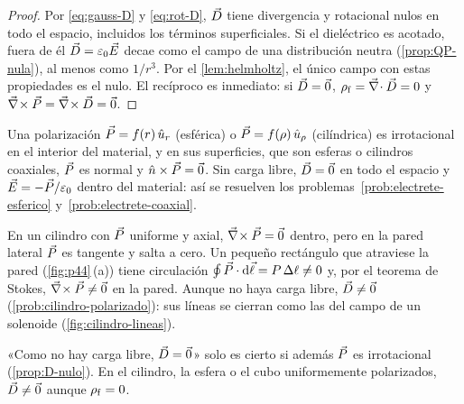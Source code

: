 \begin{proof}
Por \eqref{eq:gauss-D} y \eqref{eq:rot-D}, $\vec D$ tiene divergencia y rotacional nulos en todo el espacio, incluidos
los términos superficiales. Si el dieléctrico es acotado, fuera de él $\vec D=\varepsilon_0\vec E$ decae como el campo de una
distribución neutra (\cref{prop:QP-nula}), al menos como $1/r^3$. Por el \cref{lem:helmholtz}, el único campo con
estas propiedades es el nulo. El recíproco es inmediato: si $\vec D=\vec 0$, $\rho_{\mathrm f}=\vec\nabla\!\cdot\vec D=0$ y $\vec\nabla\!\times\vec P=\vec\nabla\!\times\vec D=\vec 0$.
\end{proof}

\begin{ejemplo}\label{ej:radial}
Una polarización $\vec P=f(r)\,\hat u_{r}$ (esférica) o $\vec P=f(\rho)\,\hat u_{\rho}$ (cilíndrica) es irrotacional en el interior del
material, y en sus superficies, que son esferas o cilindros coaxiales, $\vec P$ es normal y $\hat n\times\vec P=\vec 0$. Sin
carga libre, $\vec D=\vec 0$ en todo el espacio y $\vec E=-\vec P/\varepsilon_0$ dentro del material: así se resuelven los
problemas~\ref{prob:electrete-esferico} y~\ref{prob:electrete-coaxial}.
\end{ejemplo}

\begin{ejemplo}\label{ej:stokes}
En un cilindro con $\vec P$ uniforme y axial, $\vec\nabla\!\times\vec P=\vec 0$ dentro, pero en la pared lateral $\vec P$ es tangente y salta a
cero. Un pequeño rectángulo que atraviese la pared (\cref{fig:p44}\,(a)) tiene circulación $\oint\vec P\cdot\mathop{}\!\mathrm{d}\vec\ell=P\,\Delta\ell\neq0$ y,
por el teorema de Stokes, $\vec\nabla\!\times\vec P\neq\vec 0$ en la pared. Aunque no haya carga libre, $\vec D\neq\vec 0$
(\cref{prob:cilindro-polarizado}): sus líneas se cierran como las del campo de un solenoide
(\cref{fig:cilindro-lineas}).
\end{ejemplo}

\begin{trampa}
«Como no hay carga libre, $\vec D=\vec 0$» solo es cierto si además $\vec P$ es irrotacional (\cref{prop:D-nulo}). En el
cilindro, la esfera o el cubo uniformemente polarizados, $\vec D\neq\vec 0$ aunque $\rho_{\mathrm f}=0$.
\end{trampa}
